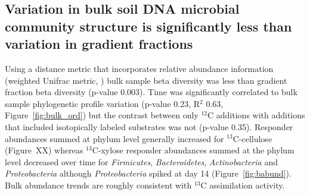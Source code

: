 \subsection{Variation in bulk soil DNA microbial community structure is
significantly less than variation in gradient fractions} 
Using a distance metric that incorporates relative abundance information
(weighted Unifrac metric, \citep{Lozupone_2005}) bulk sample beta diversity was
less than gradient fraction beta diversity (p-value 0.003). Time was
significantly correlated to bulk sample phylogenetic profile variation (p-value
0.23, R$^{2}$ 0.63, Figure~\ref{fig:bulk_ord}) but the contrast between only
$^{12}$C additions with additions that included isotopically labeled substrates
was not (p-value 0.35). Responder abundances summed at phylum level generally 
increased for $^{13}$C-cellulose (Figure~XX) whereas $^{13}$C-xylose responder abundances 
summed at the phylum level decreased over time for \textit{Firmicutes}, \textit{Bacteroidetes},
\textit{Actinobacteria} and \textit{Proteobacteria} although 
\textit{Proteobacteria} spiked at day 14 (Figure~\ref{fig:babund}). Bulk abundance trends are
roughly consistent with $^{13}$C assimilation activity. 